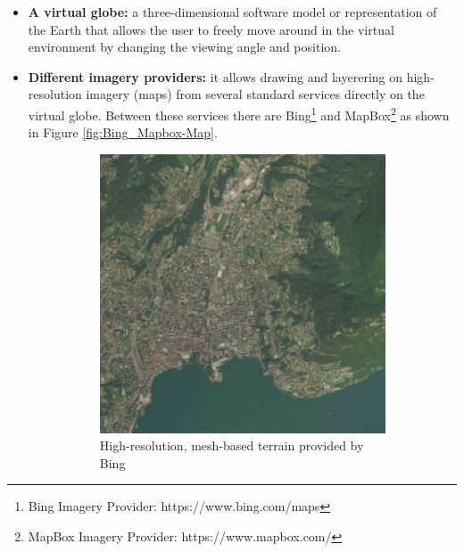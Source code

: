 \begin{itemize}
	\item {\bf A virtual globe:} a three-dimensional software model or representation of the Earth that allows the user to freely move around in the virtual environment by changing the viewing angle and position.
	\item {\bf Different imagery providers:} it allows drawing and layerering on high-resolution imagery (maps) from several standard services directly on the virtual globe. Between these services there are Bing\footnote{Bing Imagery Provider: https://www.bing.com/maps} and MapBox\footnote{MapBox Imagery Provider: https://www.mapbox.com/} as shown in Figure \ref{fig:Bing_Mapbox-Map}.
	\begin{figure} [h]
		\centering
		\begin{subfigure}[b]{0.3\textwidth}
			\includegraphics[width=1\textwidth]{chapter2/images/Bing-Map}
			\caption{High-resolution, mesh-based terrain provided by Bing}
			\label{fig:Bing-Map}
		\end{subfigure}
		 \qquad
		\begin{subfigure}[b]{0.3\textwidth}

\end{subfigure}
\end{figure}
\end{itemize}
